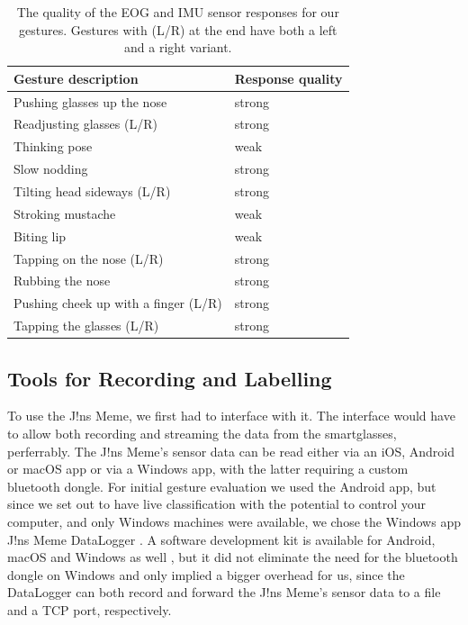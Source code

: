 \documentclass[runningheads]{llncs}
\begin{document}
\begin{table}
\centering
\caption{The quality of the EOG and IMU sensor responses for our gestures. Gestures 
        with (L/R) at the end have both a left and a right variant.}\label{tab:responses}
\begin{tabular}{|l|l|}
    \hline
    Gesture description & Response quality\\
    \hline
    Pushing glasses up the nose & strong\\
    Readjusting glasses (L/R)& strong\\
    Thinking pose & weak\\
    Slow nodding & strong\\
    Tilting head sideways (L/R)& strong\\
    Stroking mustache & weak\\
    Biting lip & weak\\
    Tapping on the nose (L/R)& strong\\
    Rubbing the nose & strong\\
    Pushing cheek up with a finger (L/R)& strong\\
    Tapping the glasses (L/R)& strong\\\hline
\end{tabular}
\end{table}

\subsection{Tools for Recording and Labelling}
To use the J!ns Meme, we first had to interface with it. The interface would have to allow
both recording and streaming the data from the smartglasses, perferrably.
The J!ns Meme's sensor data can be read either via an iOS, Android or macOS app
or via a Windows app, with the latter requiring a custom bluetooth dongle. For
initial gesture evaluation we used the Android app, but since we set out to have
live classification with the potential to control your computer, and only Windows
machines were available, we chose the Windows app J!ns Meme DataLogger
\cite{jinsMemeDataLoggerWin}. A software development kit is available for Android, macOS
and Windows as well \cite{jinsMemeSDK}, but it did not eliminate the
need for the bluetooth dongle on Windows and only implied a bigger overhead for us,
since the DataLogger can both record and forward the J!ns Meme's sensor data to a
file and a TCP port, respectively.
\end{document}
